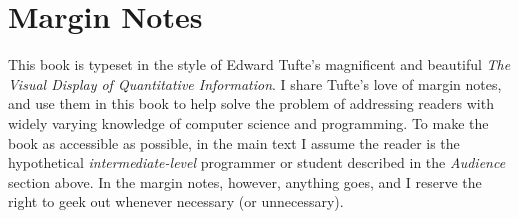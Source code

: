 












\newpage

\section{Margin Notes}\label{sec:preface:margin-notes}

This book is typeset in the style of Edward Tufte's
magnificent and beautiful \emph{The Visual Display of
  Quantitative Information}\cite{Tufte:1986:VDQ:33404}.  I share
Tufte's love of margin notes, and use them in this book to help solve the problem of addressing readers with
widely varying knowledge of computer science and programming.
%
To make the book as accessible as possible, in the main text I assume
the reader is the hypothetical \emph{intermediate-level} programmer or
student described in the \emph{Audience} section above.
%
In the margin notes, however, anything goes, and I reserve the right
to geek out whenever necessary (or unnecessary).


